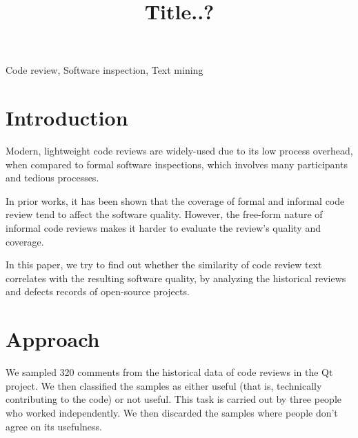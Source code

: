 \documentclass[conference]{IEEEtran}
\begin{document}
\title{Title..?}

\maketitle
{}
{\newcommand{\nbnote}[2]{
  \fcolorbox{blue}{yellow}{\bfseries\sffamily\scriptsize#1}
  {\sf\small\textit{#2}}
 }
}
{\newcommand{\nbnote}[2]{}
 \newcommand{\version}{}
}
\newcommand\pick[1]{\nbnote{Pick sez}{\textcolor{magenta}{#1}}}
\newcommand\thai[1]{\nbnote{Thai sez}{\textcolor{blue}{#1}}}


\begin{IEEEkeywords}
Code review, Software inspection, Text mining
\end{IEEEkeywords}



\section{Introduction}

Modern, lightweight code reviews are widely-used due to its low process overhead,
when compared to formal software inspections, which involves many participants and tedious processes.

In prior works, it has been shown
that the coverage of formal \thai{cite from the citation found in McIntosh's paper}
and informal \thai{cite McIntosh} code review tend to affect the software quality.
However, the free-form nature of informal code reviews makes it harder to evaluate the review's quality and coverage.

In this paper,
we try to find out whether the similarity of code review text correlates with the resulting software quality,
by analyzing the historical reviews and defects records of open-source projects.


\section{Approach}

We sampled 320 comments from the historical data of code reviews in the Qt project.
We then classified the samples as either useful (that is, technically contributing to the code) or not useful.
This task is carried out by three people who worked independently.
We then discarded the samples where people don't agree on its usefulness.
\end{document}
